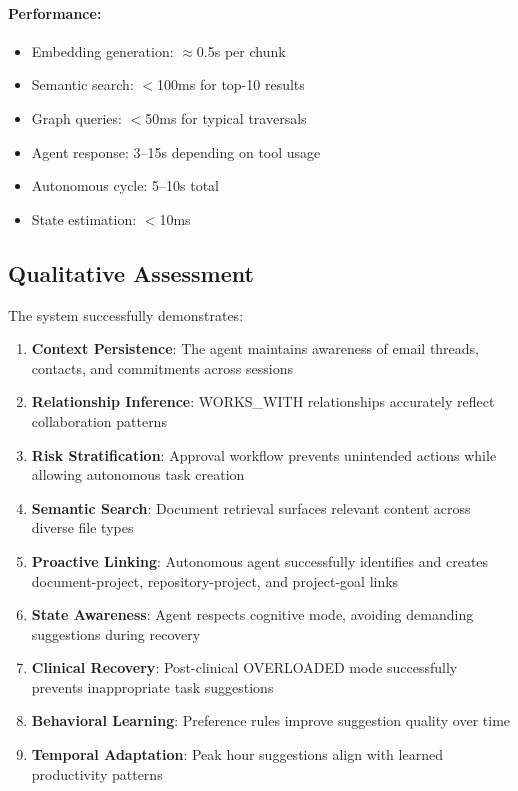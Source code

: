 \documentclass[11pt,a4paper]{article}
\begin{document}
\paragraph{Performance:}
\begin{itemize}
    \item Embedding generation: $\approx$0.5s per chunk
    \item Semantic search: $<$100ms for top-10 results
    \item Graph queries: $<$50ms for typical traversals
    \item Agent response: 3--15s depending on tool usage
    \item Autonomous cycle: 5--10s total
    \item State estimation: $<$10ms
\end{itemize}

\subsection{Qualitative Assessment}

The system successfully demonstrates:
\begin{enumerate}
    \item \textbf{Context Persistence}: The agent maintains awareness of email threads, contacts, and commitments across sessions
    \item \textbf{Relationship Inference}: WORKS\_WITH relationships accurately reflect collaboration patterns
    \item \textbf{Risk Stratification}: Approval workflow prevents unintended actions while allowing autonomous task creation
    \item \textbf{Semantic Search}: Document retrieval surfaces relevant content across diverse file types
    \item \textbf{Proactive Linking}: Autonomous agent successfully identifies and creates document-project, repository-project, and project-goal links
    \item \textbf{State Awareness}: Agent respects cognitive mode, avoiding demanding suggestions during recovery
    \item \textbf{Clinical Recovery}: Post-clinical OVERLOADED mode successfully prevents inappropriate task suggestions
    \item \textbf{Behavioral Learning}: Preference rules improve suggestion quality over time
    \item \textbf{Temporal Adaptation}: Peak hour suggestions align with learned productivity patterns
\end{enumerate}
\end{document}
